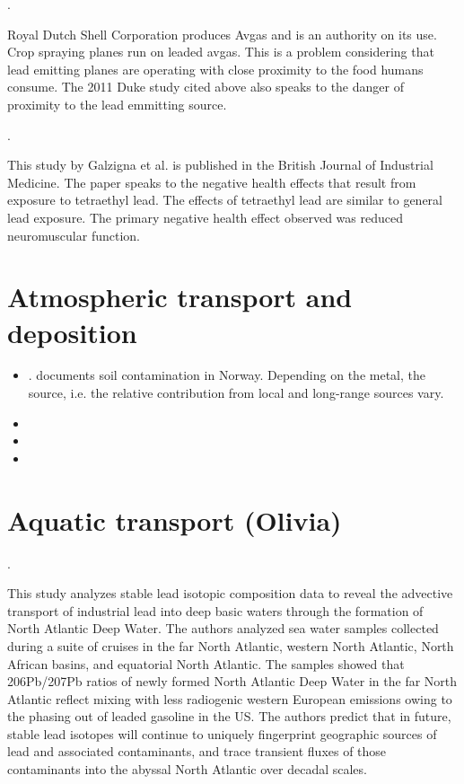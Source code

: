 \documentclass{article}
\begin{document}
\bigskip

\noindent {} .

Royal Dutch Shell Corporation produces Avgas and is an authority on its use. Crop spraying planes run on leaded avgas. This is a problem considering that lead emitting planes are operating with close proximity to the food humans consume. The 2011 Duke study cited above also speaks to the danger of proximity to the lead emmitting source.

\bigskip



\bigskip
\noindent {}.
\medskip

This study by Galzigna et al. is published in the British Journal of Industrial Medicine. The paper speaks to the negative health effects that result from exposure to tetraethyl lead. The effects of tetraethyl lead are similar to general lead exposure. The primary negative health effect observed was reduced neuromuscular function.



\section{Atmospheric transport and deposition}
\begin{itemize}
  \item {}. \cite{steinnes1997evidence} documents soil contamination in Norway. Depending on the metal, the source, i.e. the relative contribution from local and long-range sources vary. 
  \item {}
  \item {}
  \item {}
\end{itemize}


\section{Aquatic transport (Olivia)}

\noindent {}.
\medskip

This study analyzes stable lead isotopic composition data to reveal the advective transport of industrial lead into deep basic waters through the formation of North Atlantic Deep Water. The authors analyzed sea water samples collected during a suite of cruises in the far North Atlantic, western North Atlantic, North African basins, and equatorial North Atlantic. The samples showed that 206Pb/207Pb ratios of newly formed North Atlantic Deep Water in the far North Atlantic reflect mixing with less radiogenic western European emissions owing to the phasing out of leaded gasoline in the US. The authors predict that in future, stable lead isotopes will continue to uniquely fingerprint geographic sources of lead and associated contaminants, and trace transient fluxes of those contaminants into the abyssal North Atlantic over decadal scales.
\end{document}
